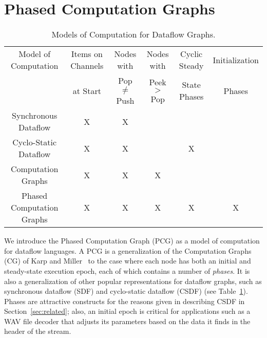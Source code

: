 \section{Phased Computation Graphs}
\label{sec:pcg}

\begin{table}[t]
\small
\begin{center}
\begin{tabular}{|c|c|c|c|c|c|} \hline
Model of Computation & Items on Channels & Nodes with & Nodes with & Cyclic Steady & Initialization \\
                     & at Start & Pop $\ne$ Push & Peek $>$ Pop & State Phases & Phases \\
\hline \hline
Synchronous Dataflow \cite{LM87-i} & X & X & & & \\
\hline
Cyclo-Static Dataflow \cite{BELP96} & X & X & & X & \\
\hline
Computation Graphs \cite{KM66} & X & X & X & & \\
\hline
Phased Computation Graphs & X & X & X & X & X \\
\hline
\end{tabular}
\vspace{-6pt}
\caption{\protect\small Models of Computation for Dataflow Graphs.}
\label{tab:models}
\vspace{-12pt}
\end{center}
\end{table}

We introduce the Phased Computation Graph (PCG) as a model of
computation for dataflow languages.  A PCG is a generalization of the
Computation Graphs (CG) of Karp and Miller~\cite{KM66} to the case
where each node has both an initial and steady-state execution epoch,
each of which contains a number of {\it phases}.  It is also a
generalization of other popular representations for dataflow graphs,
such as synchronous dataflow (SDF) and cyclo-static dataflow (CSDF)
(see Table~\ref{tab:models}).  Phases are attractive constructs for
the reasons given in describing CSDF in Section~\ref{sec:related};
also, an initial epoch is critical for applications such as a WAV file
decoder that adjusts its parameters based on the data it finds in the
header of the stream.

